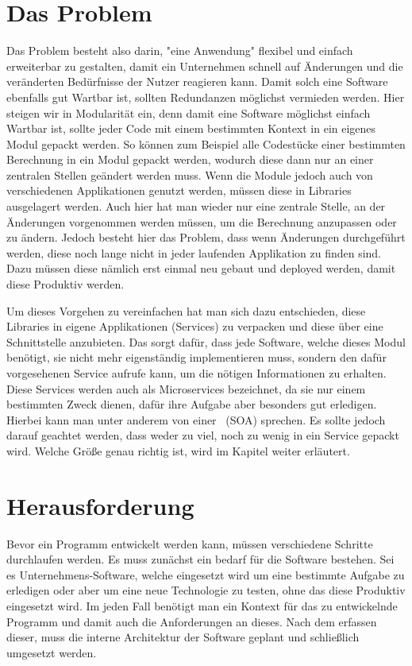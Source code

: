 \section{Das Problem}
\label{sec:dasProblem}
Das Problem besteht also darin, "eine Anwendung" flexibel und einfach erweiterbar zu gestalten, damit ein Unternehmen schnell auf Änderungen und die veränderten Bedürfnisse der Nutzer reagieren kann. Damit solch eine Software ebenfalls gut Wartbar ist, sollten Redundanzen möglichst vermieden werden. Hier steigen wir in Modularität ein, denn damit eine Software möglichst einfach Wartbar ist, sollte jeder Code mit einem bestimmten Kontext in ein eigenes Modul gepackt werden. So können zum Beispiel alle Codestücke einer bestimmten Berechnung in ein Modul gepackt werden, wodurch diese dann nur an einer zentralen Stellen geändert werden muss. Wenn die Module jedoch auch von verschiedenen Applikationen genutzt werden, müssen diese in Libraries ausgelagert werden. Auch hier hat man wieder nur eine zentrale Stelle, an der Änderungen vorgenommen werden müssen, um die Berechnung anzupassen oder zu ändern. Jedoch besteht hier das Problem, dass wenn Änderungen durchgeführt werden, diese noch lange nicht in jeder laufenden Applikation zu finden sind. Dazu müssen diese nämlich erst einmal neu gebaut und deployed werden, damit diese Produktiv werden.

Um dieses Vorgehen zu vereinfachen hat man sich dazu entschieden, diese Libraries in eigene Applikationen (Services) zu verpacken und diese über eine Schnittstelle anzubieten. Das sorgt dafür, dass jede Software, welche dieses Modul benötigt, sie nicht mehr eigenständig implementieren muss, sondern den dafür vorgesehenen Service aufrufe kann, um die nötigen Informationen zu erhalten. Diese Services werden auch als Microservices bezeichnet, da sie nur einem bestimmten Zweck dienen, dafür ihre Aufgabe aber besonders gut erledigen. Hierbei kann man unter anderem von einer \SOA\ (SOA) sprechen. Es sollte jedoch darauf geachtet werden, dass weder zu viel, noch zu wenig in ein Service gepackt wird. Welche Größe genau richtig ist, wird im Kapitel  weiter erläutert.

\section{Herausforderung}
\label{sec:herausforderung}
Bevor ein Programm entwickelt werden kann, müssen verschiedene Schritte durchlaufen werden. Es muss zunächst ein bedarf für die Software bestehen. Sei es Unternehmens-Software, welche eingesetzt wird um eine bestimmte Aufgabe zu erledigen oder aber um eine neue Technologie zu testen, ohne das diese Produktiv eingesetzt wird. Im jeden Fall benötigt man ein Kontext für das zu entwickelnde Programm und damit auch die Anforderungen an dieses. Nach dem erfassen dieser, muss die interne Architektur der Software geplant und schließlich umgesetzt werden. 

